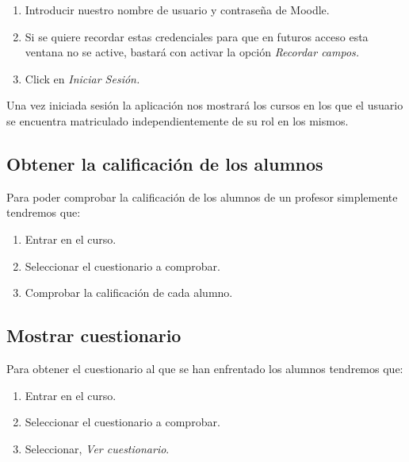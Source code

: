 \begin{enumerate}
	\item Introducir nuestro nombre de usuario y contraseña de Moodle.
	\item Si se quiere recordar estas credenciales para que en futuros acceso esta ventana no se active, bastará con activar la opción \emph{Recordar campos.}
	\item Click en \emph{Iniciar Sesión.}
\end{enumerate}

Una vez iniciada sesión la aplicación nos mostrará los cursos en los que el usuario se encuentra matriculado independientemente de su rol en los mismos.




\subsection{Obtener la calificación de los alumnos}

Para poder comprobar la calificación de los alumnos de un profesor simplemente tendremos que:

\begin{enumerate}
	\item Entrar en el curso.
	\item Seleccionar el cuestionario a comprobar.
	\item Comprobar la calificación de cada alumno.
\end{enumerate}


\subsection{Mostrar cuestionario}

Para obtener el cuestionario al que se han enfrentado los alumnos tendremos que:

\begin{enumerate}
	\item Entrar en el curso.
	\item Seleccionar el cuestionario a comprobar.
	\item Seleccionar, \emph{Ver cuestionario}.
\end{enumerate}


